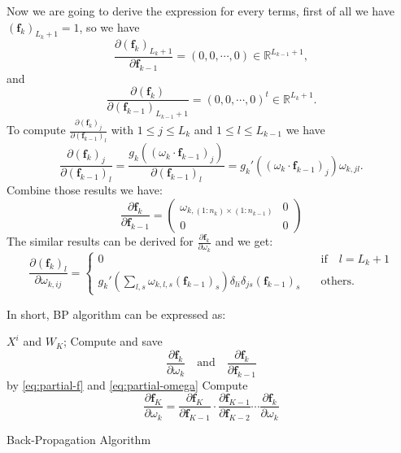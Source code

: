 Now we are going to derive the expression for every terms, first of all we have $(\bm{f}_k)_{L_k + 1} = 1$, so we have 
$$
\frac{\partial(\bm f_k)_{L_{k} + 1}}{\partial \bm f_{k-1}} = (0,0,\cdots,0) \in \mathbb{R}^{L_{k-1} + 1},
$$
and
$$
\frac{\partial(\bm f_k)}{\partial (\bm f_{k-1})_{L_{k-1}+1}} = (0,0,\cdots,0)^{t} \in \mathbb{R}^{L_{k} + 1}.
$$
To compute $\frac{\partial(\bm f_k)_j}{\partial (\bm f_{k-1})_{l}}$ with $ 1 \le j \le L_k$ and $1 \le l \le L_{k-1}$ we have 
$$
\frac{\partial(\bm f_k)_j}{\partial (\bm f_{k-1})_{l}} = \frac{ g_k( (\omega_k \cdot \bm{f}_{k-1})_j)}{\partial (\bm f_{k-1})_{l}} = g_k'((\omega_k \cdot \bm{f}_{k-1})_j)\omega_{k,jl} .
$$
Combine those results we have:
\begin{equation}\label{eq:partial-f}
    \frac{\partial \bm{f}_k}{\partial \bm{f}_{k-1}} = 
    \begin{pmatrix}
        \omega_{k, (1:n_{k} )\times(1:n_{k-1})} & 0 \\
        0 & 0
    \end{pmatrix}
\end{equation}
The similar results can be derived for $\frac{ \partial \bm{f}_k}{\partial \omega_{k}}$ and we get:
\begin{equation}\label{eq:partial-omega}
    \frac{ \partial (\bm{f}_k)_l}{\partial \omega_{k,ij}} = \begin{cases}
        0 &\text{if} \quad l = L_k + 1\\
        g_k'( \sum_{l,s} \omega_{k,l,s}(\bm{f}_{k-1})_s)\delta_{li}\delta_{js}(\bm{f}_{k-1})_{s} \quad &\text{others}.
    \end{cases}
\end{equation} 

In short, BP algorithm can be expressed as:
\begin{algorithm}[H]
    \begin{algorithmic}[1]
          $X^i$ and $W_K$;
        \STATE Compute and save 
        $$\frac{ \partial \bm{f}_k}{\partial \omega_{k}}  \quad \text{and} \quad \frac{\partial \bm{f}_k}{\partial \bm{f}_{k-1}}$$ by \ref{eq:partial-f} and \ref{eq:partial-omega}
        \STATE Compute 
        $$\frac{ \partial \bm{f}_K}{\partial \omega_{k}} = \frac{\partial \bm{f}_K}{\partial \bm{f}_{K-1}} \cdot \frac{ \partial \bm{f}_{K-1}}{\partial \bm{f}_{K-2}} \cdots \frac{ \partial \bm{f}_k}{\partial \omega_{k}}$$
        \ENDFOR
    \end{algorithmic}
    \caption{Back-Propagation Algorithm}
\end{algorithm}



